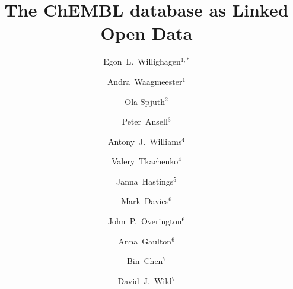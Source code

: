 \documentclass[10pt]{bmc_article}
\newenvironment{bmcformat}{\begin{raggedright}\baselineskip20pt\sloppy\setboolean{publ}{false}}{\end{raggedright}\baselineskip20pt\sloppy}
\begin{document}
\begin{bmcformat}

\title{The ChEMBL database as Linked Open Data}
 
\author{Egon~L.~Willighagen$^{1,*}$\and
Andra~Waagmeester$^1$\and
Ola Spjuth$^2$\and
Peter~Ansell$^3$\and
Antony~J.~Williams$^4$\and
Valery~Tkachenko$^4$\and
Janna~Hastings$^5$\and
Mark~Davies$^6$\and
John~P.~Overington$^6$\and
Anna~Gaulton$^6$\and
Bin~Chen$^7$\and
David~J.~Wild$^7$
}

\address{\iid(1)Department of Bioinformatics - BiGCaT, Maastricht University, P.O. Box 616, UNS50 Box 19, NL-6200 MD, Maastricht, The Netherlands  \\
\iid(2)Department of Pharmaceutical Biosciences, Uppsala University, PO Box 591, SE-751 24, Uppsala, Sweden \\
\iid(3)University of Queensland, St Lucia, Qld 4072, Australia \\
\iid(4)Royal Society of Chemistry, 904 Tamaras Circle, Wake Forest, NC 27587, U.S.A. \\
\iid(5)Cheminformatics and Metabolism, European Bioinformatics Institute, Wellcome Trust Genome Campus, Hinxton, Cambridgeshire, CB10 1SD, United Kingdom \\
\iid(6)Chemogenomics, European Bioinformatics Institute, Wellcome Trust Genome Campus, Hinxton, Cambridgeshire, CB10 1SD, United Kingdom \\ 
\iid(7)School of Informatics and Computing, Indiana University, Bloomington, IN, U.S.A.
}

\maketitle


\end{bmcformat}
\end{document}
